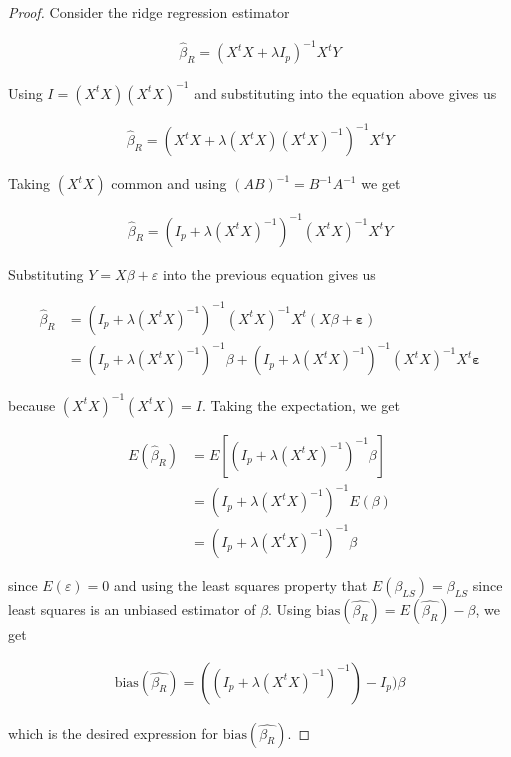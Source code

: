 \documentclass[paper=a4, fontsize=11pt]{scrartcl} %
\numberwithin{equation}{section} %
\begin{document}
\begin{proof}

Consider the ridge regression estimator

\begin{align}
\hat{\beta}_R = (X^t X + \lambda I_p)^{-1} X^t Y
\end{align}

Using $I = (X^t X)(X^t X)^{-1}$ and substituting into the equation above gives us

\begin{align}
\hat{\beta}_R = (X^t X + \lambda (X^t X)(X^t X)^{-1})^{-1} X^t Y
\end{align}

Taking $(X^t X)$ common and using $(AB)^{-1} = B^{-1}A^{-1}$ we get

\begin{align}
\hat{\beta}_R = (I_p + \lambda (X^t X)^{-1})^{-1} (X^t X)^{-1} X^t Y 
\end{align}

Substituting $Y = X \beta + \varepsilon$ into the previous equation gives us

\begin{align}
\hat{\beta}_R &= (I_p + \lambda (X^t X)^{-1})^{-1} (X^t X)^{-1} X^t (X \beta + \bm{\varepsilon} ) \\
			  &=(I_p + \lambda (X^t X)^{-1})^{-1} \beta + (I_p + \lambda (X^t X)^{-1})^{-1} (X^t X)^{-1} X^t \bm{\varepsilon}
\end{align}

because $(X^t X)^{-1} (X^t X) = I$.  Taking the expectation, we get

\begin{align}
E(\hat{\beta}_R) &= E[(I_p + \lambda (X^t X)^{-1})^{-1} \beta] \\
				 &= (I_p + \lambda (X^t X)^{-1})^{-1} E(\beta) \\
				 &= (I_p + \lambda (X^t X)^{-1})^{-1} \beta
\end{align}

since $E(\varepsilon) = 0$ and using the least squares property that $E(\beta_{LS}) = \beta_{LS}$ since least squares is an unbiased estimator of $\beta$. Using $\textrm{bias}(\hat{\beta_R}) = E(\hat{\beta_R}) - \beta$, we get

\begin{align}
\textrm{bias}(\hat{\beta_R}) = ((I_p + \lambda (X^t X)^{-1})^{-1}) - I_p) \beta
\end{align}

which is the desired expression for $\textrm{bias}(\hat{\beta_R})$.
\end{proof}
\end{document}
